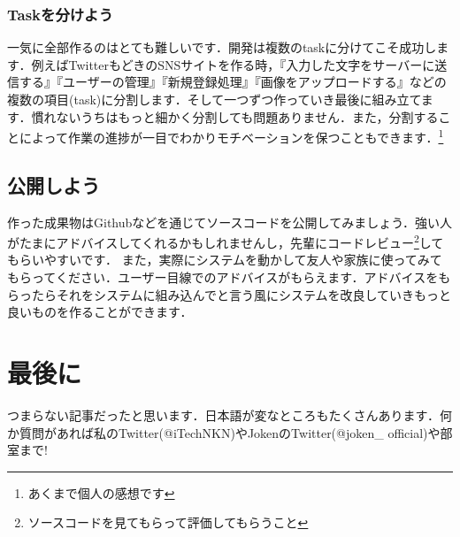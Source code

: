 \documentclass{jsarticle}
\begin{document}
\subsubsection{Taskを分けよう}
一気に全部作るのはとても難しいです．開発は複数のtaskに分けてこそ成功します．例えばTwitterもどきのSNSサイトを作る時，『入力した文字をサーバーに送信する』『ユーザーの管理』『新規登録処理』『画像をアップロードする』などの複数の項目(task)に分割します．そして一つずつ作っていき最後に組み立てます．慣れないうちはもっと細かく分割しても問題ありません．また，分割することによって作業の進捗が一目でわかりモチベーションを保つこともできます．\footnote{あくまで個人の感想です}

\subsection{公開しよう}
作った成果物はGithubなどを通じてソースコードを公開してみましょう．強い人がたまにアドバイスしてくれるかもしれませんし，先輩にコードレビュー\footnote{ソースコードを見てもらって評価してもらうこと}してもらいやすいです．\newline
また，実際にシステムを動かして友人や家族に使ってみてもらってください．ユーザー目線でのアドバイスがもらえます．アドバイスをもらったらそれをシステムに組み込んでと言う風にシステムを改良していきもっと良いものを作ることができます．

\section{最後に}
つまらない記事だったと思います．日本語が変なところもたくさんあります．何か質問があれば私のTwitter(@iTechNKN)やJokenのTwitter(@joken\_ official)や部室まで!
\end{document}

